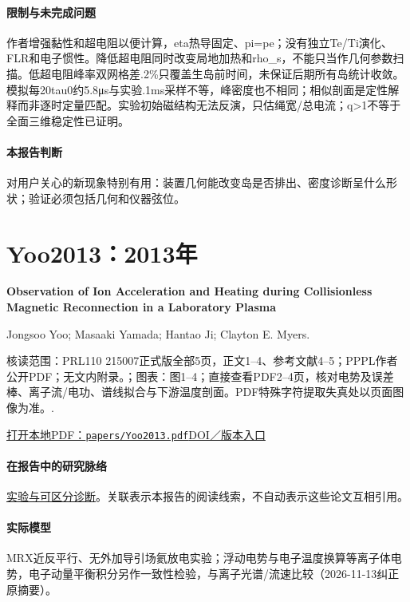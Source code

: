 \documentclass[UTF8,a4paper,11pt,openany,fontset=fandol]{ctexbook}
\begin{document}
\paragraph{限制与未完成问题}作者增强黏性和超电阻以便计算，eta热导固定、pi=pe；没有独立Te/Ti演化、FLR和电子惯性。降低超电阻同时改变局地加热和rho\_s，不能只当作几何参数扫描。低超电阻峰率双网格差.2\%只覆盖生岛前时间，未保证后期所有岛统计收敛。模拟每20tau0约5.8μs与实验.1ms采样不等，峰密度也不相同；相似剖面是定性解释而非逐时定量匹配。实验初始磁结构无法反演，只估绳宽/总电流；q>1不等于全面三维稳定性已证明。

\paragraph{本报告判断}对用户关心的新现象特别有用：装置几何能改变岛是否排出、密度诊断呈什么形状；验证必须包括几何和仪器弦位。

\section{Yoo2013：2013年}\label{paper:Yoo2013}

\textbf{Observation of Ion Acceleration and Heating during Collisionless Magnetic Reconnection in a Laboratory Plasma}\citep{Yoo2013}\

Jongsoo Yoo;  Masaaki Yamada;  Hantao Ji;  Clayton E. Myers.

\textsf{核读范围：}PRL110 215007正式版全部5页，正文1–4、参考文献4–5；PPPL作者公开PDF；无文内附录。；\textsf{图表：}图1–4；直接查看PDF2–4页，核对电势及误差棒、离子流/电功、谱线拟合与下游温度剖面。PDF特殊字符提取失真处以页面图像为准。.

\href{run:../papers/Yoo2013.pdf}{打开本地PDF：\texttt{papers/Yoo2013.pdf}}\quad\href{https://doi.org/10.1103/PhysRevLett.110.215007}{DOI／版本入口}

\paragraph{在报告中的研究脉络}\hyperref[story:diagnostic]{实验与可区分诊断}。关联表示本报告的阅读线索，不自动表示这些论文互相引用。

\paragraph{实际模型}MRX近反平行、无外加导引场氦放电实验；浮动电势与电子温度换算等离子体电势，电子动量平衡积分另作一致性检验，与离子光谱/流速比较（2026-11-13纠正原摘要）。
\end{document}
